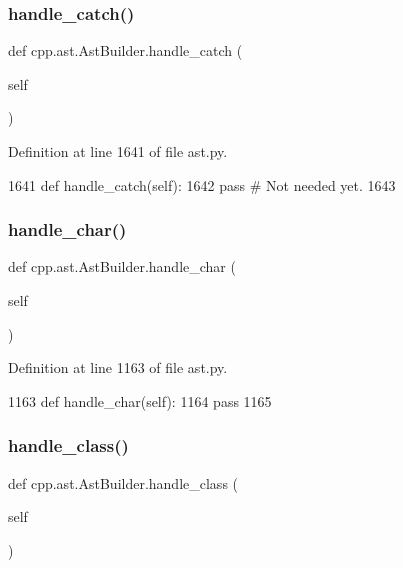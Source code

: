 \subsubsection{\texorpdfstring{handle\+\_\+catch()}{handle\_catch()}}
{\footnotesize\ttfamily def cpp.\+ast.\+Ast\+Builder.\+handle\+\_\+catch (\begin{DoxyParamCaption}\item[{}]{self }\end{DoxyParamCaption})}



Definition at line 1641 of file ast.\+py.


\begin{DoxyCode}
1641     \textcolor{keyword}{def }handle\_catch(self):
1642         \textcolor{keywordflow}{pass}  \textcolor{comment}{# Not needed yet.}
1643 
\end{DoxyCode}
\mbox{\label{classcpp_1_1ast_1_1AstBuilder_adfbb93646d0d32b39a19f3c70cc031f8}} 
\subsubsection{\texorpdfstring{handle\+\_\+char()}{handle\_char()}}
{\footnotesize\ttfamily def cpp.\+ast.\+Ast\+Builder.\+handle\+\_\+char (\begin{DoxyParamCaption}\item[{}]{self }\end{DoxyParamCaption})}



Definition at line 1163 of file ast.\+py.


\begin{DoxyCode}
1163     \textcolor{keyword}{def }handle\_char(self):
1164         \textcolor{keywordflow}{pass}
1165 
\end{DoxyCode}
\mbox{\label{classcpp_1_1ast_1_1AstBuilder_a93bd39632593bec36972355b7e1893e0}} 
\subsubsection{\texorpdfstring{handle\+\_\+class()}{handle\_class()}}
{\footnotesize\ttfamily def cpp.\+ast.\+Ast\+Builder.\+handle\+\_\+class (\begin{DoxyParamCaption}\item[{}]{self }\end{DoxyParamCaption})}



